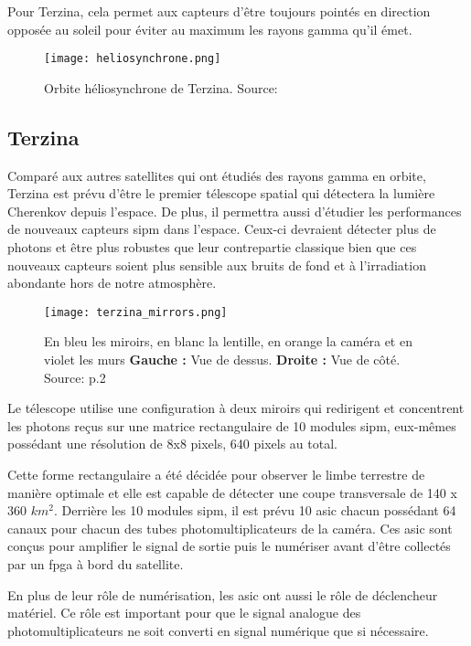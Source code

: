 Pour Terzina, cela permet aux capteurs d'être toujours pointés en direction opposée au soleil pour éviter au maximum les rayons gamma qu'il émet.

\begin{figure}[tbph!]
	\centering
	\texttt{[image: heliosynchrone.png]}
	\caption[Orbite héliosynchrone de Terzina]{Orbite héliosynchrone de Terzina. Source: \cite{Nuses}}
\end{figure}

\subsection{Terzina}
Comparé aux autres satellites qui ont étudiés des rayons gamma en orbite, Terzina est prévu d'être le premier télescope spatial
qui détectera la lumière Cherenkov depuis l'espace. De plus, il permettra aussi d'étudier les performances de nouveaux capteurs \gls{sipm}
dans l'espace. Ceux-ci devraient détecter plus de photons et être plus robustes que leur contrepartie classique bien que ces nouveaux capteurs
soient plus sensible aux bruits de fond et à l'irradiation abondante hors de notre atmosphère.

\begin{figure}[tbph!]
	\centering
	\texttt{[image: terzina\_mirrors.png]}
	\caption[Vue de la configuration optique de Terzina]
	{En bleu les miroirs, en blanc la lentille, en orange la caméra et en violet les murs \textbf{Gauche :} Vue de dessus. \textbf{Droite :} Vue de côté. Source: \cite{Burmistrov_2023} p.2}
\end{figure}

Le télescope utilise une configuration à deux miroirs qui redirigent et concentrent les photons reçus sur une matrice 
rectangulaire de 10 modules \gls{sipm}, eux-mêmes possédant une résolution de 8x8 pixels, 640 pixels au total. \cite{Burmistrov_2023}

Cette forme rectangulaire a été décidée pour observer le limbe terrestre de manière optimale et elle est capable de détecter une coupe transversale de 140 x 360 $km^2$.
Derrière les 10 modules \gls{sipm}, il est prévu 10 \gls{asic} chacun possédant 64 canaux pour chacun des tubes photomultiplicateurs de la caméra.
Ces \gls{asic} sont conçus pour amplifier le signal de sortie puis le numériser avant d'être collectés par un \gls{fpga} à bord du satellite. 

En plus de leur rôle de numérisation, les \gls{asic} ont aussi le rôle de déclencheur matériel. 
Ce rôle est important pour que le signal analogue des photomultiplicateurs ne soit converti en signal numérique que si nécessaire. 

